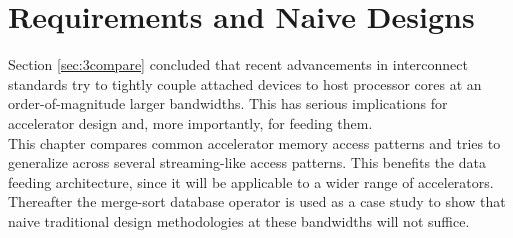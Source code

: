 \chapter{Requirements and Naive Designs}
Section \ref{sec:3compare} concluded that recent advancements in interconnect standards try to tightly couple attached devices to host processor cores at an order-of-magnitude larger bandwidths. This has serious implications for accelerator design and, more importantly, for feeding them.\\
This chapter compares common accelerator memory access patterns and tries to generalize across several streaming-like access patterns. This benefits the data feeding architecture, since it will be applicable to a wider range of accelerators. Thereafter the merge-sort database operator is used as a case study to show that naive traditional design methodologies at these bandwidths will not suffice.





